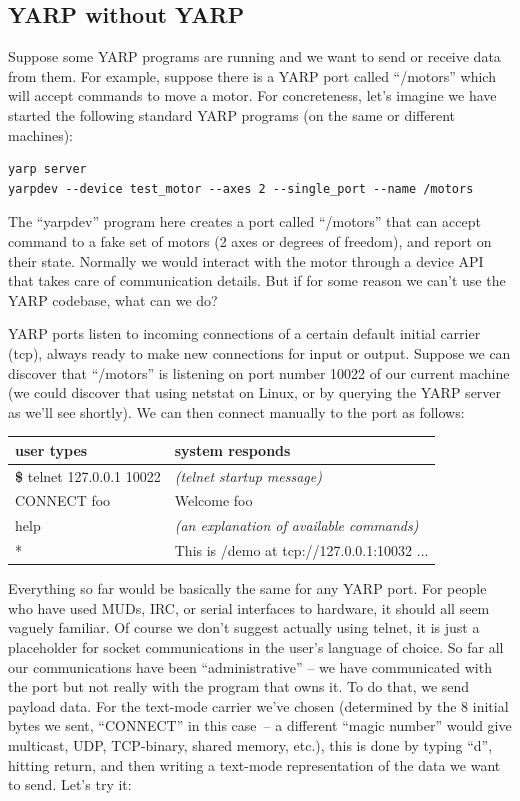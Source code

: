 \subsection{YARP without YARP}

Suppose some YARP programs are running and we want to send or
receive data from them.
%
For example, suppose there is a YARP 
port called ``/motors'' which will accept commands to move a
motor.  For concreteness, let's imagine we have started the
following standard YARP programs (on the same or different 
machines):

\begin{verbatim}
yarp server
yarpdev --device test_motor --axes 2 --single_port --name /motors
\end{verbatim}

The ``yarpdev'' program here creates a port called ``/motors'' that can
accept command to a fake set of motors (2 axes or degrees of freedom),
and report on their state.
%
Normally we would interact with the motor through a device API
that takes care of communication details.  But if for 
some reason we can't use the YARP codebase, what can
we do?

YARP ports listen to incoming connections of
a certain default initial carrier (tcp), always ready to make
new connections for input or output.  Suppose we can discover that
``/motors'' is listening on port number 10022 of our current machine (we could
discover that using netstat on Linux, or by querying the YARP server
as we'll see shortly).
%
We can then connect manually to the port as follows:

\begin{center}
\begin{tabular}{ll}
\hline\hline
{\bf user types} & {\bf system responds} \\
\hline
{\bf \$} telnet 127.0.0.1 10022 & {\it (telnet startup message)} \\
CONNECT foo & Welcome foo \\
help & {\it (an explanation of available commands)} \\
* & This is /demo at tcp://127.0.0.1:10032 ... \\
\hline\hline
\end{tabular}
\end{center}

Everything so far would be basically the same for any YARP port.
For people who have used MUDs, IRC, or serial interfaces to hardware,
it should all seem vaguely familiar.
%
Of course we don't suggest actually using telnet, it is just
a placeholder for socket communications in the user's language
of choice.
%
So far all our communications have been ``administrative'' --
we have communicated with the port but not really with the 
program that owns it.  To do that, we send payload data.  For the
text-mode carrier we've chosen (determined by the 8 initial
bytes we sent, ``CONNECT\textvisiblespace'' in this case~-- a 
different ``magic number'' would give multicast, UDP, TCP-binary,
shared memory, etc.), 
this is done by typing
``d'', hitting return, and then writing a text-mode representation of
the data we want to send.  Let's try it:

